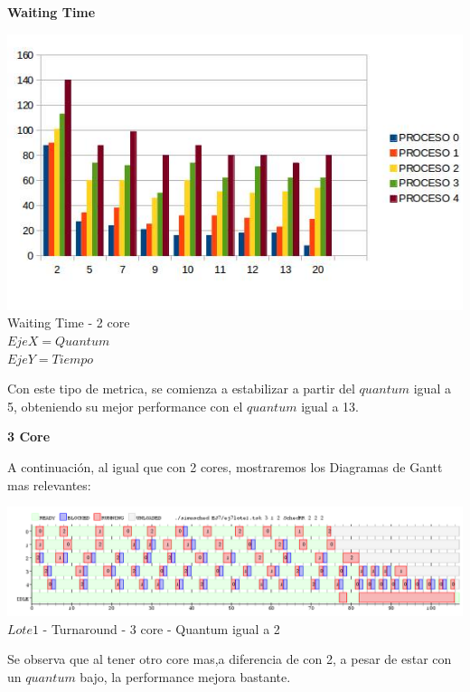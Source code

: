  \begin{center}
  \textbf{Waiting Time}
 \end{center}

  \begin{center}
    	\includegraphics[width=1\textwidth]{./EJ7/waiting2core.jpg}
	{Waiting Time - 2 core}	\\
	{$Eje X = Quantum$\\$Eje Y = Tiempo$}\\
 \end{center} 
 
 \indent Con este tipo de metrica, se comienza a estabilizar a partir del $quantum$ igual a 5, obteniendo su mejor
 performance con el $quantum$ igual a 13.\\
 
   \begin{center}
   \textbf{3 Core}
   \end{center}
   \indent A continuación, al igual que con 2 cores, mostraremos los Diagramas de Gantt mas relevantes:
   
   \begin{center}
    	\includegraphics[width=450pt]{./EJ7/ej7tour3core1quan.png}
	{$Lote 1$ - Turnaround - 3 core - Quantum igual a 2}	
 \end{center}

 \indent Se observa que al tener otro core mas,a diferencia de con 2, a pesar de estar con un $quantum$ bajo,
 la performance mejora bastante.\\ 
 

